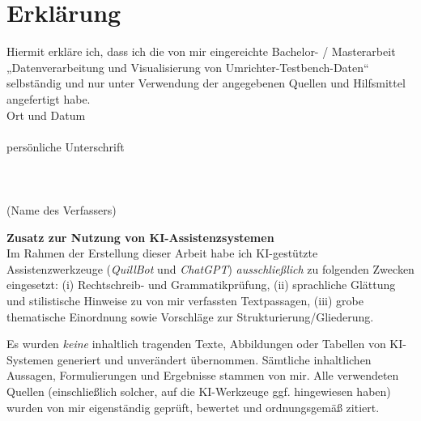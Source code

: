 \newpage
\section{Erklärung}
\label{sec:erklarung}
\label{sec:erklärung}

Hiermit erkläre ich, dass ich die von mir eingereichte Bachelor- / Masterarbeit
„Datenverarbeitung und Visualisierung von Umrichter-Testbench-Daten“ selbständig und nur unter Verwendung der
angegebenen Quellen und Hilfsmittel angefertigt habe.
\\
Ort und Datum
\\
\\
persönliche Unterschrift
\\
\\
\\
\\
(Name des Verfassers)


\medskip
\noindent\textbf{Zusatz zur Nutzung von KI-Assistenzsystemen}\\
Im Rahmen der Erstellung dieser Arbeit habe ich KI-gestützte Assistenzwerkzeuge
(\emph{QuillBot} und \emph{ChatGPT})
\emph{ausschließlich} zu folgenden Zwecken eingesetzt:
(i) Rechtschreib- und Grammatikprüfung,
(ii) sprachliche Glättung und stilistische Hinweise zu von mir verfassten Textpassagen,
(iii) grobe thematische Einordnung sowie Vorschläge zur Strukturierung/Gliederung.

Es wurden \emph{keine} inhaltlich tragenden Texte, Abbildungen oder Tabellen von KI-Systemen generiert und unverändert übernommen. Sämtliche inhaltlichen Aussagen, Formulierungen und Ergebnisse stammen von mir.
Alle verwendeten Quellen (einschließlich solcher, auf die KI-Werkzeuge ggf. hingewiesen haben) wurden von mir eigenständig geprüft, bewertet und ordnungsgemäß zitiert.
